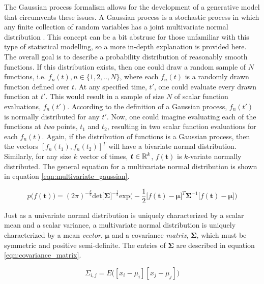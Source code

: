 \documentclass{article}
\begin{document}
The Gaussian process formalism allows for the development of a generative model that circumvents these issues. A Gaussian process is a stochastic process in which any finite collection of random variables has a joint multivariate normal distribution \cite{lee2017deep}. This concept can be a bit abstruse for those unfamiliar with this type of statistical modelling, so a more in-depth explanation is provided here. The overall goal is to describe a probability distribution of reasonably smooth functions. If this distribution exists, then one could draw a random sample of $N$ functions, i.e. $f_n(t), n \in \{1,2,.., N\}$, where each $f_n(t)$ is a randomly drawn function defined over $t$. At any specified time, $t'$, one could evaluate every drawn function at $t'$.  This would result in a sample of size $N$ of scalar function evaluations, $f_n(t')$. According to the definition of a Gaussian process, $f_n(t')$ is normally distributed for any $t'$. Now, one could imagine evaluating each of the functions at \textit{two} points, $t_1$ and $t_2$, resulting in two scalar function evaluations for each $f_n(t)$. Again, if the distribution of functions is a Gaussian process, then the vectors $[f_n(t_1), f_n(t_2)]^T$ will have a bivariate normal distribution. Similarly, for any size $k$ vector of times, $\boldsymbol{t} \in \mathbb{R}^k$, $f(\boldsymbol{t})$ is $k$-variate normally distributed. The general equation for a multivariate normal distribution is shown in equation \ref{eqn:multivariate_gaussian}.

 \begin{equation}
  \label{eqn:multivariate_gaussian}
  p\bigg(f(\boldsymbol{t}) \bigg) =
  (2\pi)^{-\frac{k}{2}}\text{det}\big[\boldsymbol{\Sigma}\big]^{-\frac{1}{2}}\text{exp}\bigg(-\frac{1}{2}\big[f(\boldsymbol{t}) - \boldsymbol{\mu}\big]^T \boldsymbol{\Sigma}^{-1}\big[f(\boldsymbol{t}) - \boldsymbol{\mu}\big] \bigg)
\end{equation}



\noindent Just as a univariate normal distribution is uniquely characterized by a scalar mean and a scalar variance, a multivariate normal distribution is uniquely characterized by a mean \textit{vector}, $\boldsymbol{\mu}$  and a covariance \textit{matrix}, $\boldsymbol{\Sigma}$, which must be symmetric and positive semi-definite. The entries of $\boldsymbol{\Sigma}$ are described in equation \ref{eqn:covariance_matrix}.

 \begin{equation}
  \label{eqn:covariance_matrix}
  \Sigma_{i,j} = E\bigg([x_i- \mu_i][x_j - \mu_j] \bigg)
\end{equation}
\end{document}
